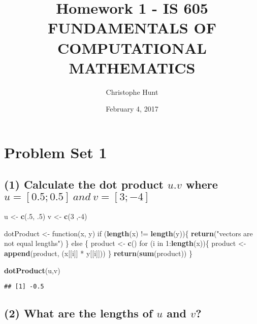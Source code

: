 \documentclass[]{article}
\title{Homework 1 - IS 605 FUNDAMENTALS OF COMPUTATIONAL MATHEMATICS}
\author{Christophe Hunt}
\date{February 4, 2017}
\newenvironment{Shaded}{\begin{snugshade}}{\end{snugshade}}
\newcommand{\KeywordTok}[1]{\textcolor[rgb]{0.13,0.29,0.53}{\textbf{{#1}}}}
\newcommand{\DecValTok}[1]{\textcolor[rgb]{0.00,0.00,0.81}{{#1}}}
\newcommand{\StringTok}[1]{\textcolor[rgb]{0.31,0.60,0.02}{{#1}}}
\newcommand{\NormalTok}[1]{{#1}}
\begin{document}
\maketitle

{
\setcounter{tocdepth}{2}
\tableofcontents
}
\section{Problem Set 1}\label{problem-set-1}

\subsection{\texorpdfstring{(1) Calculate the dot product \(u.v\) where
\(u = [0.5; 0.5]~and~v = [3; -4]\)}{(1) Calculate the dot product u.v where u = {[}0.5; 0.5{]}\textasciitilde{}and\textasciitilde{}v = {[}3; -4{]}}}\label{calculate-the-dot-product-u.v-where-u-0.5-0.5andv-3--4}

\begin{Shaded}
\begin{Highlighting}[]
\NormalTok{u <-}\StringTok{  }\KeywordTok{c}\NormalTok{(.}\DecValTok{5}\NormalTok{, .}\DecValTok{5}\NormalTok{)}
\NormalTok{v <-}\StringTok{  }\KeywordTok{c}\NormalTok{(}\DecValTok{3} \NormalTok{,-}\DecValTok{4}\NormalTok{)}

\NormalTok{dotProduct <-}\StringTok{ }\NormalTok{function(x, y)}
\NormalTok{if (}\KeywordTok{length}\NormalTok{(x) !=}\StringTok{ }\KeywordTok{length}\NormalTok{(y))\{}
  \KeywordTok{return}\NormalTok{(}\StringTok{"vectors are not equal lengths"}\NormalTok{)}
  \NormalTok{\} else \{}
    \NormalTok{product <-}\StringTok{ }\KeywordTok{c}\NormalTok{()}
      \NormalTok{for (i in }\DecValTok{1}\NormalTok{:}\KeywordTok{length}\NormalTok{(x))\{}
           \NormalTok{product <-}\StringTok{ }\KeywordTok{append}\NormalTok{(product, (x[[i]] *}\StringTok{ }\NormalTok{y[[i]]))}
       \NormalTok{\}}
  \KeywordTok{return}\NormalTok{(}\KeywordTok{sum}\NormalTok{(product))}
\NormalTok{\}}

\KeywordTok{dotProduct}\NormalTok{(u,v)}
\end{Highlighting}
\end{Shaded}

\begin{verbatim}
## [1] -0.5
\end{verbatim}

\newpage

\subsection{\texorpdfstring{(2) What are the lengths of \(u\) and
\(v\)?}{(2) What are the lengths of u and v?}}\label{what-are-the-lengths-of-u-and-v}
\end{document}

